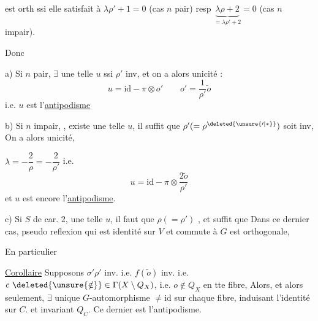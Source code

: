 
est orth ssi elle satisfait à $\lambda\rho'+1=0$ (cas $n$ pair) resp $\underbrace{\lambda\rho+2}_{=\lambda\rho'+2}=0$ (cas $n$ impair).

Donc

a) Si $n$ pair, $\exists$ une telle $u$  ssi $\rho'$ inv, et on a alors unicité :
\[
u=\mathrm{id}-\pi\otimes o'\qquad o'=\frac1{\rho'}\widetilde o\tag*{(6)}
\]
i.e. $u$ est l'\uline{antipodisme}

b) Si $n$ impair, ,     existe une telle $u$, il   suffit que $\rho' (=\rho^{\deleted{\unsure{\prime|*}}})$ soit inv,     On a alors unicité,


$\lambda=-\dfrac2\rho=-\dfrac2{\rho'}$ i.e.
\[
u=\mathrm{id}-\pi\otimes\frac{2\widetilde o}{\rho'}\tag*{(7)}
\]
et $u$ est encore l'\uline{antipodisme}.

c) Si  $S$ de car. $2$,    une telle $u$, il  faut que $\rho(=\rho')$  , et suffit que   Dans ce dernier cas,  pseudo reflexion qui est identité sur $V$ et commute à $G$ est orthogonale,



En particulier

\uline{Corollaire} Supposons $\sigma'\rho'$ inv. i.e. $f(\widetilde o)$ inv. i.e. $c\ \deleted{\unsure{\notin}}\in\Gamma(X\setminus Q_X)$,  i.e. $o\notin Q_X$ en tte fibre,  Alors, et alors seulement,  $\exists$ unique $G$-automorphisme $\ne\mathrm{id}$ sur chaque fibre, induisant l'identité sur $C$. et invariant $Q_C$. Ce dernier est l'antipodisme.

